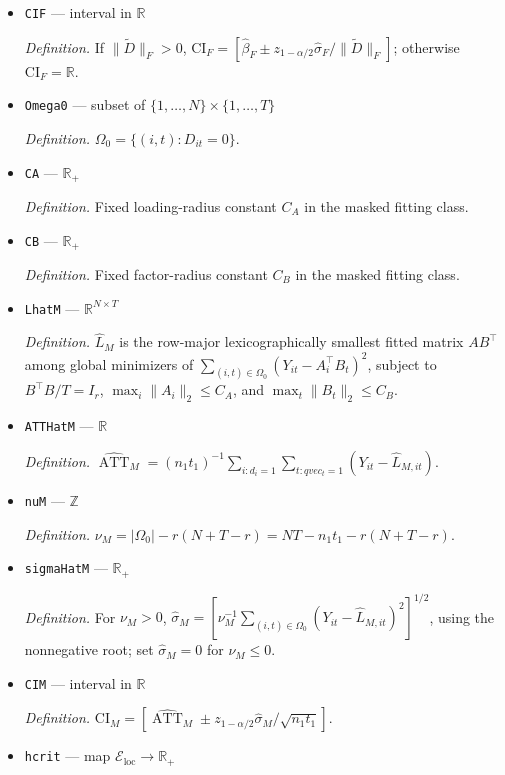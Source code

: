 \documentclass{article}
\begin{document}
\begin{itemize}
  \item \texttt{CIF} --- interval in \(\mathbb R\)
  \par\smallskip\noindent\emph{Definition.} If \(\|\widetilde D\|_F>0\), \(\mathrm{CI}_F=[\widehat\beta_F\pm z_{1-\alpha/2}\widehat\sigma_F/\|\widetilde D\|_F]\); otherwise \(\mathrm{CI}_F=\mathbb R\).
  \item \texttt{Omega0} --- subset of \(\{1,\ldots,N\}\times\{1,\ldots,T\}\)
  \par\smallskip\noindent\emph{Definition.} \(\Omega_0=\{(i,t):D_{it}=0\}\).
  \item \texttt{CA} --- \(\mathbb R_{+}\)
  \par\smallskip\noindent\emph{Definition.} Fixed loading-radius constant \(C_A\) in the masked fitting class.
  \item \texttt{CB} --- \(\mathbb R_{+}\)
  \par\smallskip\noindent\emph{Definition.} Fixed factor-radius constant \(C_B\) in the masked fitting class.
  \item \texttt{LhatM} --- \(\mathbb R^{N\times T}\)
  \par\smallskip\noindent\emph{Definition.} \(\widehat L_M\) is the row-major lexicographically smallest fitted matrix \(AB^{\top}\) among global minimizers of \(\sum_{(i,t)\in\Omega_0}(Y_{it}-A_i^{\top}B_t)^2\), subject to \(B^{\top}B/T=I_r\), \(\max_i\|A_i\|_2\le C_A\), and \(\max_t\|B_t\|_2\le C_B\).
  \item \texttt{ATTHatM} --- \(\mathbb R\)
  \par\smallskip\noindent\emph{Definition.} \(\widehat{\operatorname{ATT}}_M=(n_1t_1)^{-1}\sum_{i:d_i=1}\sum_{t:qvec_t=1}(Y_{it}-\widehat L_{M,it})\).
  \item \texttt{nuM} --- \(\mathbb Z\)
  \par\smallskip\noindent\emph{Definition.} \(\nu_M=|\Omega_0|-r(N+T-r)=NT-n_1t_1-r(N+T-r)\).
  \item \texttt{sigmaHatM} --- \(\mathbb R_{+}\)
  \par\smallskip\noindent\emph{Definition.} For \(\nu_M>0\), \(\widehat\sigma_M=[\nu_M^{-1}\sum_{(i,t)\in\Omega_0}(Y_{it}-\widehat L_{M,it})^2]^{1/2}\), using the nonnegative root; set \(\widehat\sigma_M=0\) for \(\nu_M\le0\).
  \item \texttt{CIM} --- interval in \(\mathbb R\)
  \par\smallskip\noindent\emph{Definition.} \(\mathrm{CI}_M=[\widehat{\operatorname{ATT}}_M\pm z_{1-\alpha/2}\widehat\sigma_M/\sqrt{n_1t_1}]\).
  \item \texttt{hcrit} --- map \(\mathcal E_{\mathrm{loc}}\to\mathbb R_{+}\)

\end{itemize}
\end{document}
